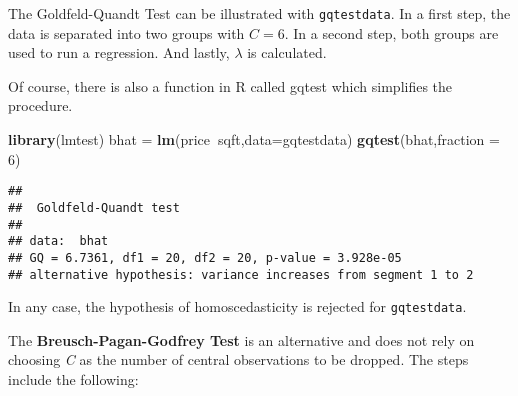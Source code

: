 \documentclass[
]{article}
\newenvironment{Shaded}{\begin{snugshade}}{\end{snugshade}}
\newcommand{\DataTypeTok}[1]{\textcolor[rgb]{0.13,0.29,0.53}{#1}}
\newcommand{\DecValTok}[1]{\textcolor[rgb]{0.00,0.00,0.81}{#1}}
\newcommand{\KeywordTok}[1]{\textcolor[rgb]{0.13,0.29,0.53}{\textbf{#1}}}
\newcommand{\NormalTok}[1]{#1}
\newcommand{\OperatorTok}[1]{\textcolor[rgb]{0.81,0.36,0.00}{\textbf{#1}}}
\newcommand{\StringTok}[1]{\textcolor[rgb]{0.31,0.60,0.02}{#1}}
\begin{document}
The Goldfeld-Quandt Test can be illustrated with \texttt{gqtestdata}. In a first step, the data is separated into two groups with \(C=6\). In a second step, both groups are used to run a regression. And lastly, \(\lambda\) is calculated.

\begin{Shaded}
\end{Shaded}

Of course, there is also a function in R called gqtest which simplifies the procedure.

\begin{Shaded}
\begin{Highlighting}[]
\KeywordTok{library}\NormalTok{(lmtest)}
\NormalTok{bhat                =}\StringTok{ }\KeywordTok{lm}\NormalTok{(price}\OperatorTok{~}\NormalTok{sqft,}\DataTypeTok{data=}\NormalTok{gqtestdata)}
\KeywordTok{gqtest}\NormalTok{(bhat,}\DataTypeTok{fraction =} \DecValTok{6}\NormalTok{)}
\end{Highlighting}
\end{Shaded}

\begin{verbatim}
## 
##  Goldfeld-Quandt test
## 
## data:  bhat
## GQ = 6.7361, df1 = 20, df2 = 20, p-value = 3.928e-05
## alternative hypothesis: variance increases from segment 1 to 2
\end{verbatim}

In any case, the hypothesis of homoscedasticity is rejected for \texttt{gqtestdata}.

The \textbf{Breusch-Pagan-Godfrey Test} is an alternative and does not rely on choosing \emph{C} as the number of central observations to be dropped. The steps include the following:
\end{document}
